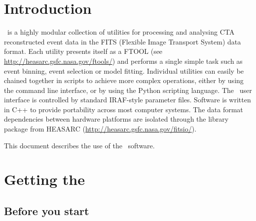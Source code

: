 \documentclass{article}[12pt,a4]
\begin{document}
\frontpage


%
\section{Introduction}

\this\ is a highly modular collection of utilities for processing and analysing CTA reconstructed
event data in the FITS (Flexible Image Transport System) data format.
Each utility presents itself as a FTOOL 
(see \url{http://heasarc.gsfc.nasa.gov/ftools/}) and performs a single simple task such as event binning, 
event selection or model fitting.
Individual utilities can easily be chained together in scripts to achieve more complex operations,
either by using the command line interface, or by using the Python 
scripting language.
The \this\ user interface is controlled by standard IRAF-style parameter files.
Software is written in C++ to provide portability across most computer systems. 
The data format dependencies between hardware platforms are isolated through the 
\cfitsio\index{\cfitsio} library package from HEASARC 
(\url{http://heasarc.gsfc.nasa.gov/fitsio/}).

This document describes the use of the \this\ software. 


%
\section{Getting the \this}

\subsection{Before you start}
\end{document}
